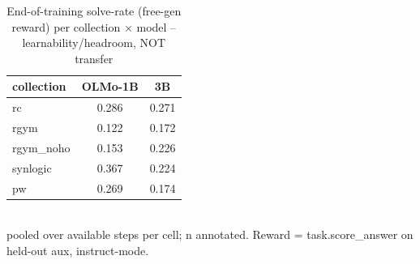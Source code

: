\begin{table}[t]\centering
\caption{End-of-training solve-rate (free-gen reward) per collection × model -- learnability/headroom, NOT transfer}\label{tab:saturation_reward_table}
\begin{tabular}{lcc}
\toprule
collection & OLMo-1B & 3B \\
\midrule
rc & 0.286 & 0.271 \\
rgym & 0.122 & 0.172 \\
rgym\_noho & 0.153 & 0.226 \\
synlogic & 0.367 & 0.224 \\
pw & 0.269 & 0.174 \\
\bottomrule
\end{tabular}
\\[2pt]{\footnotesize pooled over available steps per cell; n annotated. Reward = task.score\_answer on held-out aux, instruct-mode.}
\end{table}
